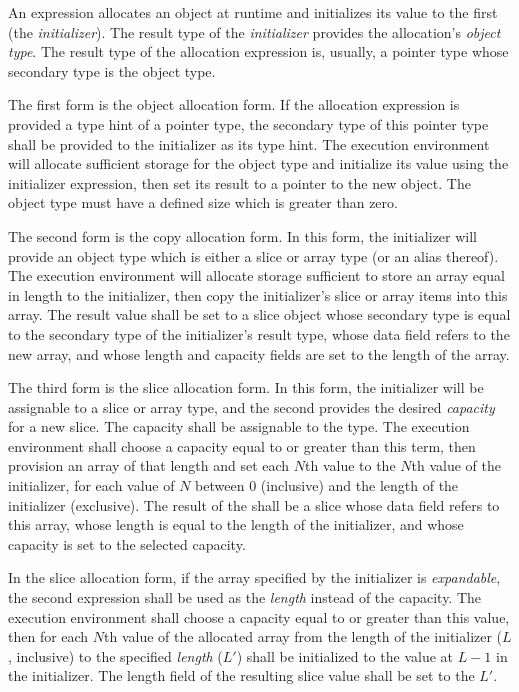 \specsubsubitem
An  expression allocates an object at runtime and initializes
its value to the first  (the \textit{initializer}). The
result type of the \textit{initializer} provides the allocation's
\textit{object type}. The result type of the allocation expression is, usually,
a pointer type whose secondary type is the object type.

\specsubsubitem
The first form is the object allocation form. If the allocation expression is
provided a type hint of a pointer type, the secondary type of this pointer type
shall be provided to the initializer as its type hint. The execution
environment will allocate sufficient storage for the object type and initialize
its value using the initializer expression, then set its result to a pointer to
the new object. The object type must have a defined size which is greater than
zero.

\specsubsubitem
The second form is the copy allocation form. In this form, the initializer will
provide an object type which is either a slice or array type (or an alias
thereof). The execution environment will allocate storage sufficient to store
an array equal in length to the initializer, then copy the initializer's slice
or array items into this array. The result value shall be set to a slice object
whose secondary type is equal to the secondary type of the initializer's result
type, whose data field refers to the new array, and whose length and capacity
fields are set to the length of the array.

\specsubsubitem
The third form is the slice allocation form. In this form, the initializer will
be assignable to a slice or array type, and the second 
provides the desired \textit{capacity} for a new slice. The capacity shall be
assignable to the  type. The execution environment shall
choose a capacity equal to or greater than this term, then provision an array
of that length and set each $N$th value to the $N$th value of the initializer,
for each value of $N$ between $0$ (inclusive) and the length of the initializer
(exclusive). The result of the  shall be a
slice whose data field refers to this array, whose length is equal to the
length of the initializer, and whose capacity is set to the selected capacity.

\specsubsubitem
In the slice allocation form, if the array specified by the initializer is
\textit{expandable}, the second expression shall be used as the \textit{length}
instead of the capacity. The execution environment shall choose a capacity
equal to or greater than this value, then for each $N$th value of the allocated
array from the length of the initializer ($L$, inclusive) to the specified
\textit{length} ($L'$) shall be initialized to the value at $L-1$ in the
initializer. The length field of the resulting slice value shall be set to the
$L'$.

